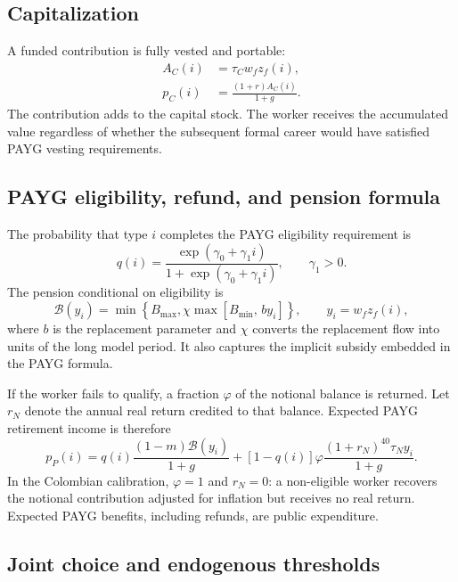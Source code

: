 \documentclass[12pt]{article}
\newcommand{\1}{\mathbf{1}}
\begin{document}
\subsection{Capitalization}

A funded contribution is fully vested and portable:
\begin{align}
A_C(i)&=\tau_C w_fz_f(i),\\
p_C(i)&=\frac{(1+r)A_C(i)}{1+g}.
\label{eq:capitalization}
\end{align}
The contribution adds to the capital stock. The worker receives the accumulated value
regardless of whether the subsequent formal career would have satisfied PAYG vesting
requirements.

\subsection{PAYG eligibility, refund, and pension formula}

The probability that type $i$ completes the PAYG eligibility requirement is
\begin{equation}
q(i)=
\frac{\exp(\gamma_0+\gamma_1i)}
{1+\exp(\gamma_0+\gamma_1i)},
\qquad \gamma_1>0.
\label{eq:eligibility}
\end{equation}
The pension conditional on eligibility is
\begin{equation}
\mathcal B(y_i)=
\min\left\{
B_{\max},
\chi\max\left[B_{\min},\,b y_i\right]
\right\},
\qquad y_i=w_fz_f(i),
\label{eq:paygformula}
\end{equation}
where $b$ is the replacement parameter and $\chi$ converts the replacement flow into units
of the long model period. It also captures the implicit subsidy embedded in the PAYG formula.

If the worker fails to qualify, a fraction $\varphi$ of the notional balance is returned.
Let $r_N$ denote the annual real return credited to that balance. Expected PAYG retirement
income is therefore
\begin{equation}
p_P(i)=
q(i)\frac{(1-m)\mathcal B(y_i)}{1+g}
+[1-q(i)]\varphi
\frac{(1+r_N)^{40}\tau_Ny_i}{1+g}.
\label{eq:paygbenefit}
\end{equation}
In the Colombian calibration, $\varphi=1$ and $r_N=0$: a non-eligible worker recovers the
notional contribution adjusted for inflation but receives no real return. Expected PAYG
benefits, including refunds, are public expenditure.

\subsection{Joint choice and endogenous thresholds}
\end{document}
